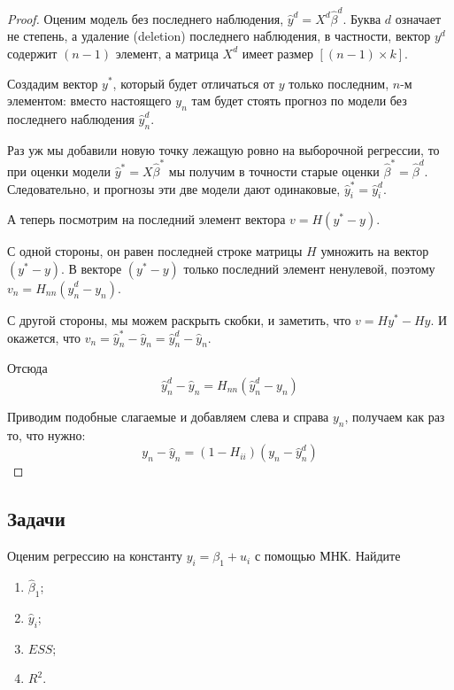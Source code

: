 \documentclass[12pt]{article}
\newcommand{\hb}{\hat{\beta}}
\newcommand{\hy}{\hat{y}}
\newcommand{\ESS}{ESS}
\begin{document}
\begin{proof}
Оценим модель без последнего наблюдения, $\hat y^{d} = X^{d} \hb^{d}$. 
Буква $d$ означает не степень, а удаление (deletion) последнего наблюдения,
в частности, вектор $y^d$ содержит $(n-1)$ элемент, а матрица $X^{d}$ имеет размер $[(n-1)\times k]$.

Создадим вектор $y^{*}$, который будет отличаться от $y$ только последним, $n$-м элементом:
вместо настоящего $y_n$ там будет стоять прогноз по модели без последнего наблюдения $\hat y^{d}_n$.

Раз уж мы добавили новую точку лежащую ровно на выборочной регрессии, то при оценки модели
$\hat y^* = X \hat \beta^*$ мы получим в точности старые оценки $\hat \beta^* = \hat \beta^d$. 
Следовательно, и прогнозы эти две модели дают одинаковые, $\hat y_i^* = \hat y_i^d$.

А теперь посмотрим на последний элемент вектора $v = H (y^* - y)$.

С одной стороны, он равен последней строке матрицы $H$ умножить на вектор $(y^* - y)$. 
В векторе $(y^* - y)$ только последний элемент ненулевой, поэтому $v_n = H_{nn} (\hat y^{d}_n - y_n)$.

С другой стороны, мы можем раскрыть скобки, и заметить, что $v = Hy^* - Hy$. 
И окажется, что $v_n = \hat y_n^* - \hat y_n = \hat y_n^d - \hat y_n$.

Отсюда
\[
 \hat y_n^d - \hat y_n = H_{nn} (\hat y_n^d - y_n)
\]

Приводим подобные слагаемые и добавляем слева и справа $y_n$, получаем как раз то, что нужно:
\[
y_n - \hat y_n   = (1 - H_{ii}) (y_n - \hat y_n^d )
\]
\end{proof}


\subsection{Задачи}


\begin{problem}
    Оценим  регрессию на константу $y_i = \beta_1 + u_i$ с помощью МНК. 
    Найдите
    \begin{enumerate}
        \item $\hb_1$;
        \item $\hy_i$;
        \item $\ESS$;
        \item $R^2$.
    \end{enumerate}
\end{problem}
\end{document}
